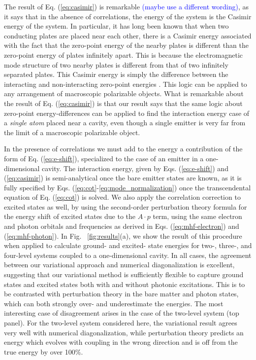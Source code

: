 \documentclass[aps,prl,twocolumn,
	groupedaddress,superscriptaddress,
	amsfonts,amssymb,amsmath,floatfix,
	citeautoscript]{revtex4-1}
\newcommand{\Jadd}[1]{\textcolor{blue}{#1}}
\begin{document}
The result of Eq. (\ref{eq:casimir}) is remarkable \Jadd{(maybe use a different wording)}, as it says that in the absence of correlations, the energy of the system is the Casimir energy of the system. In particular, it has long been known that when two conducting plates are placed near each other, there is a Casimir energy associated with the fact that the zero-point energy of the nearby plates is different than the zero-point energy of plates infinitely apart. This is because the electromagnetic mode structure of two nearby plates is different from that of two infinitely separated plates. This Casimir energy is simply the difference between the interacting and non-interacting zero-point energies \cite{casimir1948attraction,lifshitz1956theory}. This logic can be applied to any arrangement of macroscopic polarizable objects. What is remarkable about the result of Eq. (\ref{eq:casimir}) is that our result says that the same logic about zero-point energy-differences can be applied to find the interaction energy case of a \textit{single atom} placed near a cavity, even though a single emitter is very far from the limit of a macroscopic polarizable object. 

In the presence of correlations  we must add to the energy a contribution of the form of Eq. (\ref{eq:e-shift}), specialized to the case of an emitter in a one-dimensional cavity. The interaction energy, given by Eqs. (\ref{eq:e-shift}) and (\ref{eq:casimir}) is semi-analytical once the bare emitter states are known, as it is fully specified by Eqs. (\ref{eq:cot}-\ref{eq:mode_normalization}) once the transcendental equation of Eq. (\ref{eq:cot}) is solved. We also apply the correlation correction to excited states as well, by using the second-order perturbation theory formula for the energy shift of excited states due to the $A \cdot p$ term, using the same electron and photon orbitals and frequencies as derived in Eqs. (\ref{eq:mhf-electron}) and (\ref{eq:mhf-photon}). In Fig. ~\ref{fig:results}(a), we show the result of this procedure when applied to calculate ground- and excited- state energies for two-, three-, and four-level systems coupled to a one-dimensional cavity. In all cases, the agreement between our variational approach and numerical diagonalization is excellent, suggesting that our variational method is sufficiently flexible to capture ground states and excited states both with and without photonic excitations. This is to be contrasted with perturbation theory in the bare matter and photon states, which can both strongly over- and underestimate the energies. The most interesting case of disagreement arises in the case of the two-level system (top panel). For the two-level system considered here, the variational result agrees very well with numerical diagonalization, while perturbation theory predicts an energy which evolves with coupling in the wrong direction and is off from the true energy by over 100\%.
\end{document}
